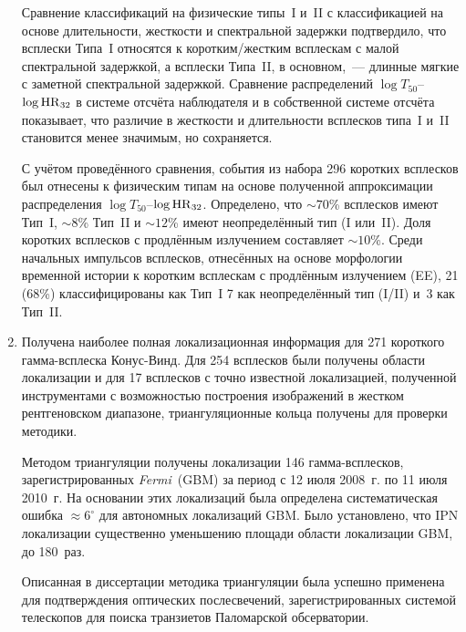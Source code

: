 \begin{enumerate}
    Сравнение классификаций на физические типы~I и~II с классификацией на основе 
    длительности, жесткости и спектральной задержки подтвердило, что всплески Типа~I 
    относятся к коротким/жестким всплескам с малой спектральной задержкой, а всплески 
    Типа~II, в основном,~--- длинные мягкие с заметной спектральной задержкой. 
    Сравнение распределений $\log T_{50}$--$\log {\mathrm{HR}}_{32}$ в системе отсчёта наблюдателя 
    и в собственной системе отсчёта показывает, что различие в жесткости и длительности
    всплесков типа~I и~II становится менее значимым, но сохраняется.
    
    С учётом проведённого сравнения, события из набора 296 коротких всплесков 
    был отнесены к физическим типам на основе полученной аппроксимации 
    распределения $\log T_{50}$--$\log {\mathrm{HR}}_{32}$. 
    Определено, что $\sim 70$\% всплесков имеют Тип~I, 
    $\sim 8$\% Тип~II и $\sim 12$\% имеют неопределённый тип (I или~II). 
    Доля коротких всплесков с продлённым излучением составляет $\sim 10$\%.
    Среди начальных импульсов всплесков, отнесённых на основе морфологии временной 
    истории к коротким всплескам с продлённым излучением (EE), 21 (68\%) классифицированы как Тип~I 
    7 как неопределённый тип (I/II) и~3 как Тип~II.
    
\item Получена наиболее полная локализационная информация для 271 короткого 
    гамма-всплеска Конус-Винд. Для 254 всплесков были получены области локализации и 
    для 17 всплесков с точно известной локализацией, полученной инструментами с 
    возможностью построения изображений в жестком рентгеновском диапазоне, триангуляционные
    кольца получены для проверки методики.

    Методом триангуляции получены локализации 146 гамма-всплесков,
    зарегистрированных \textit{Fermi}~(GBM) за период с 12 июля 2008~г. по 11 июля 2010~г.
    На основании этих локализаций была определена систематическая ошибка $\approx 6^\circ$
    для автономных локализаций GBM. Было установлено, что IPN локализации 
    существенно уменьшению площади области локализации GBM, до 180~раз.  

    Описанная в диссертации методика триангуляции была успешно применена для 
    подтверждения оптических послесвечений, зарегистрированных системой телескопов 
    для поиска транзиетов Паломарской обсерватории.
    

\end{enumerate}
